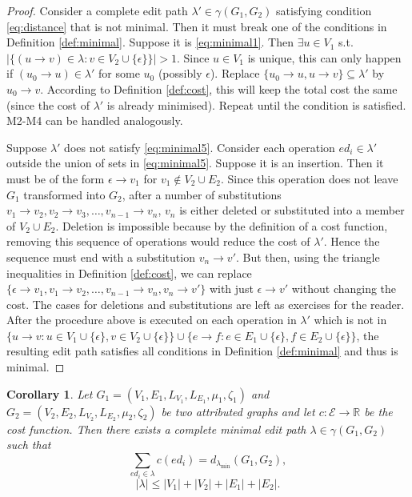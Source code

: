 \documentclass{article}
\newtheorem{corollary}{Corollary}
\theoremstyle{definition}
\begin{document}
\begin{proof}
  Consider a complete edit path $\lambda' \in \gamma(G_1, G_2)$ satisfying condition \eqref{eq:distance} that is not minimal. Then it must break one of the conditions in Definition \ref{def:minimal}. Suppose it is \eqref{eq:minimal1}. Then $\exists u \in V_1$ s.t. $|\{ (u \to v) \in \lambda: v \in V_2 \cup \{ \epsilon \} \}| > 1$. Since $u \in V_1$ is unique, this can only happen if $(u_0 \to u) \in \lambda'$ for some $u_0$ (possibly $\epsilon$). Replace $\{ u_0 \to u, u \to v \} \subseteq \lambda'$ by $u_0 \to v$. According to Definition \ref{def:cost}, this will keep the total cost the same (since the cost of $\lambda'$ is already minimised). Repeat until the condition is satisfied. M2-M4 can be handled analogously.

  Suppose $\lambda'$ does not satisfy \eqref{eq:minimal5}. Consider each operation $ed_i \in \lambda'$ outside the union of sets in \eqref{eq:minimal5}. Suppose it is an insertion. Then it must be of the form $\epsilon \to v_1$ for $v_1 \not \in V_2 \cup E_2$. Since this operation does not leave $G_1$ transformed into $G_2$, after a number of substitutions $v_1 \to v_2, v_2 \to v_3, \dots, v_{n-1} \to v_n$, $v_n$ is either deleted or substituted into a member of $V_2 \cup E_2$. Deletion is impossible because by the definition of a cost function, removing this sequence of operations would reduce the cost of $\lambda'$. Hence the sequence must end with a substitution $v_n \to v'$. But then, using the triangle inequalities in Definition \ref{def:cost}, we can replace $\{ \epsilon \to v_1, v_1 \to v_2, \dots, v_{n-1} \to v_n, v_n \to v' \}$ with just $\epsilon \to v'$ without changing the cost. The cases for deletions and substitutions are left as exercises for the reader. After the procedure above is executed on each operation in $\lambda'$ which is not in $\{ u \to v: u \in V_1 \cup \{ \epsilon \}, v \in V_2 \cup \{ \epsilon \} \} \cup \{ e \to f: e \in E_1 \cup \{ \epsilon \}, f \in E_2 \cup \{ \epsilon \} \}$, the resulting edit path satisfies all conditions in Definition \ref{def:minimal} and thus is minimal.
\end{proof}
\begin{corollary}
  Let $G_1 = (V_1, E_1, L_{V_1}, L_{E_1}, \mu_1, \zeta_1)$ and $G_2 = (V_2, E_2, L_{V_2}, L_{E_2}, \mu_2, \zeta_2)$ be two attributed graphs and let $c: \mathcal{E} \to \mathbb{R}$ be the cost function. Then there exists a complete minimal edit path $\lambda \in \gamma(G_1, G_2)$ such that
  \[ \sum_{ed_i \in \lambda} c(ed_i) = d_{\lambda_\text{min}}(G_1, G_2), \]
  \[ |\lambda| \le |V_1|+|V_2|+|E_1|+|E_2|. \]
\end{corollary}
\end{document}
